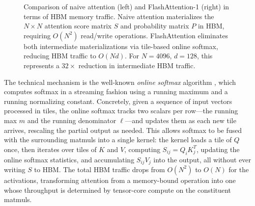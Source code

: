 \documentclass[10pt]{article}
\begin{document}
\begin{figure}[t]
\caption{Comparison of naive attention (left) and FlashAttention-1 (right) in terms of HBM memory traffic. Naive attention materializes the $N\times N$ attention score matrix $S$ and probability matrix $P$ in HBM, requiring $O(N^2)$ read/write operations. FlashAttention eliminates both intermediate materializations via tile-based online softmax, reducing HBM traffic to $O(Nd)$. For $N=4096$, $d=128$, this represents a $32\times$ reduction in intermediate HBM traffic.}
\label{fig:fa-io}
\end{figure}

The technical mechanism is the well-known \emph{online softmax} algorithm \citep{milakov2018onlinesoftmax}, which computes softmax in a streaming fashion using a running maximum and a running normalizing constant. Concretely, given a sequence of input vectors processed in tiles, the online softmax tracks two scalars per row---the running max $m$ and the running denominator $\ell$---and updates them as each new tile arrives, rescaling the partial output as needed. This allows softmax to be fused with the surrounding matmuls into a single kernel: the kernel loads a tile of $Q$ once, then iterates over tiles of $K$ and $V$, computing $S_{ij} = Q_i K_j^T$, updating the online softmax statistics, and accumulating $S_{ij} V_j$ into the output, all without ever writing $S$ to HBM. The total HBM traffic drops from $O(N^2)$ to $O(N)$ for the activations, transforming attention from a memory-bound operation into one whose throughput is determined by tensor-core compute on the constituent matmuls.
\end{document}
